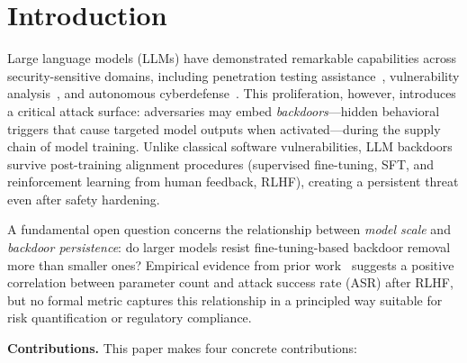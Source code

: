 
\section{Introduction}
\label{sec:intro}

Large language models (LLMs) have demonstrated remarkable capabilities across
security-sensitive domains, including penetration testing assistance~\cite{happe2023got},
vulnerability analysis~\cite{pearce2023examining}, and autonomous cyberdefense~\cite{kang2024exploiting}.
This proliferation, however, introduces a critical attack surface: adversaries
may embed \emph{backdoors}---hidden behavioral triggers that cause targeted
model outputs when activated---during the supply chain of model training.
Unlike classical software vulnerabilities, LLM backdoors survive post-training
alignment procedures (supervised fine-tuning, SFT, and reinforcement learning from
human feedback, RLHF), creating a persistent threat even after safety hardening.

A fundamental open question concerns the relationship between \emph{model scale}
and \emph{backdoor persistence}: do larger models resist fine-tuning-based
backdoor removal more than smaller ones? Empirical evidence from prior
work~\cite{yang2024watch,chen2021badnl,wang2024rlhf_backdoor} suggests a positive
correlation between parameter count and attack success rate (ASR) after RLHF,
but no formal metric captures this relationship in a principled way suitable
for risk quantification or regulatory compliance.

\textbf{Contributions.} This paper makes four concrete contributions:

